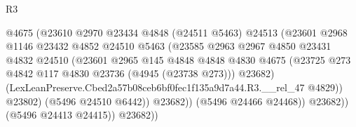 \begin{lexlean}{R3}
\begin{coremodule}
                                            @4675
                                            (@23610
                                              @2970
                                              @23434
                                              @4848
                                              (@24511 @5463)
                                              @24513
                                              (@23601
                                                @2968
                                                @1146
                                                @23432
                                                @4852
                                                @24510
                                                @5463
                                                (@23585
                                                  @2963
                                                  @2967
                                                  @4850
                                                  @23431
                                                  @4832
                                                  @24510
                                                  (@23601
                                                    @2965
                                                    @145
                                                    @4848
                                                    @4848
                                                    @4830
                                                    @4675
                                                    (@23725
                                                      @273
                                                      @4842
                                                      @117
                                                      @4830
                                                      @23736
                                                      (@4945 (@23738 @273)))
                                                    @23682)
                                                  (LexLeanPreserve.Cbed2a57b08ceb6bf0fec1f135a9d7a44.R3.__rel_47
                                                    @4829))
                                                @23802)
                                              (@5496 @24510 @6442))
                                            @23682))
                                        (@5496 @24466 @24468))
                                      @23682))
                                  (@5496 @24413 @24415))
                                @23682))

\end{coremodule}
\end{lexlean}
